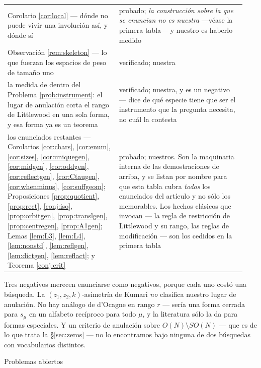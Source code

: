 \documentclass[11pt,reqno]{amsart}
\makeatletter
\newcommand{\stproved}{\textcolor{hproved}{\small probado}}
\newcommand{\stverif}{\textcolor{hverif}{\small verificado}}
\renewcommand\section{\@startsection{section}{1}%
  \z@{\linespacing\@plus\linespacing}{.5\linespacing}%
  {\normalfont\large\bfseries\centering}}
\theoremstyle{plain}
\theoremstyle{definition}
\makeatother
\begin{document}
\begin{longtable}{@{}>{\raggedright\arraybackslash}p{0.44\linewidth}%
                   >{\raggedright\arraybackslash}p{0.50\linewidth}@{}}
Corolario \ref{cor:local} --- dónde no puede vivir una involución así, y dónde sí
& \stproved; \emph{la construcción sobre la que se enuncian no es nuestra}
---véase la primera tabla--- y nuestro es haberlo medido\\
Observación \ref{rem:skeleton} --- lo que fuerzan los espacios de peso de tamaño uno &
\stverif; nuestra\\
la medida de dentro del Problema \ref{prob:instrument}: el lugar de anulación corta
el rango de Littlewood en una sola forma, y esa forma ya es un teorema & \stverif;
nuestra, y es un negativo --- dice de qué especie tiene que ser el instrumento que la
pregunta necesita, no cuál la contesta\\
los enunciados restantes --- Corolarios \ref{cor:chars}, \ref{cor:enum}, \ref{cor:sizes},
\ref{cor:uniquegen}, \ref{cor:midgen}, \ref{cor:oddgen}, \ref{cor:reflectgen}, \ref{cor:Ctaugen},
\ref{cor:whenminus}, \ref{cor:suffgeom}; Proposiciones \ref{prop:quotient}, \ref{prop:rect},
\ref{conj:iso}, \ref{prop:orbitgen}, \ref{prop:translgen}, \ref{prop:centregen}, \ref{prop:A1gen};
Lemas \ref{lem:L3}, \ref{lem:L4}, \ref{lem:nonstd}, \ref{lem:reflgen}, \ref{lem:dictgen},
\ref{lem:reflact}; y Teorema \ref{conj:crit} & \stproved; nuestros. Son la maquinaria interna de las
demostraciones de arriba, y se listan por nombre para que esta tabla cubra \emph{todos} los
enunciados del artículo y no sólo los memorables. Los hechos clásicos que invocan --- la regla de
restricción de Littlewood y su rango, las reglas de modificación --- son los cedidos en la primera
tabla\\
\bottomrule
\end{longtable}
\endgroup

\noindent
Tres negativos merecen enunciarse como negativos, porque cada uno costó una búsqueda. La
$(z_1,z_2,k)$-asimetría de Kumari \emph{no} clasifica nuestro lugar de anulación. No hay análogo de
d'Ocagne en rango $r$ --- sería una forma cerrada para $s_\mu$ en un alfabeto recíproco para todo
$\mu$, y la literatura sólo la da para formas especiales. Y un criterio de anulación sobre
$O(N)\setminus SO(N)$ --- que es de lo que trata la \S\ref{sec:zeros} --- no lo encontramos bajo
ninguna de dos búsquedas con vocabularios distintos.

\section{Problemas abiertos}\label{sec:open}
\end{document}
